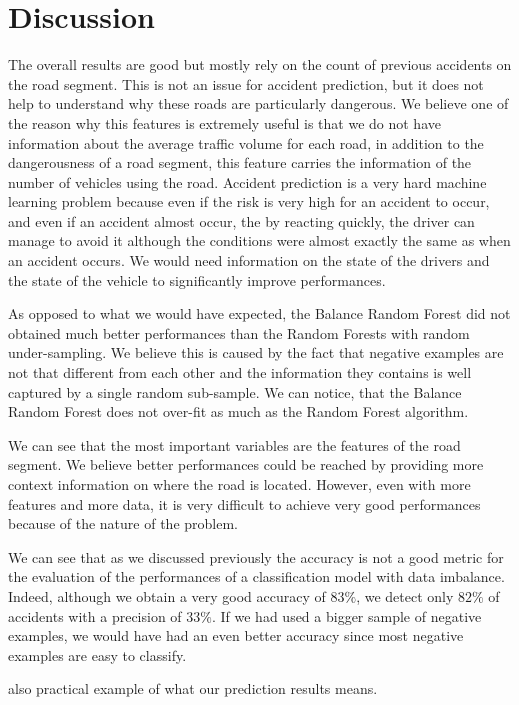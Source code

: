 \documentclass[conference]{IEEEtran}
\begin{document}
\section{Discussion}
The overall results are good but mostly rely on the count of previous accidents on the road segment.
This is not an issue for accident prediction, but it does not help to understand why these roads are particularly dangerous.
We believe one of the reason why this features is extremely useful is that we do not have information about the average traffic volume for each road, in addition to the dangerousness of a road segment, this feature carries the information of the number of vehicles using the road.
Accident prediction is a very hard machine learning problem because even if the risk is very high for an accident to occur, and even if an accident almost occur, the by reacting quickly, the driver can manage to avoid it although the conditions were almost exactly the same as when an accident occurs.
We would need information on the state of the drivers and the state of the vehicle to significantly improve performances.

As opposed to what we would have expected, the Balance Random Forest did not obtained much better performances than the Random Forests with random under-sampling.
We believe this is caused by the fact that negative examples are not that different from each other and the information they contains is well captured by a single random sub-sample.
We can notice, that the Balance Random Forest does not over-fit as much as the Random Forest algorithm.

We can see that the most important variables are the features of the road segment.
We believe better performances could be reached by providing more context information on where the road is located. However, even with more features and more data, it is very difficult to achieve very good performances because of the nature of the problem.

We can see that as we discussed previously the accuracy is not a good metric for the evaluation of the performances of a classification model with data imbalance. Indeed, although we obtain a very good accuracy of $83\%$, we detect only $82\%$ of accidents with a precision of $33\%$. If we had used a bigger sample of negative examples, we would have had an even better accuracy since most negative examples are easy to classify.

also practical example of what our prediction results means.
\end{document}
